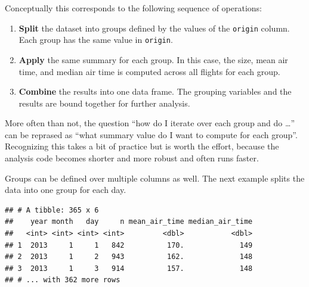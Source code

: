 \documentclass[]{book}
\newenvironment{Shaded}{}{}
\newcommand{\DataTypeTok}[1]{#1}
\newcommand{\KeywordTok}[1]{\textcolor[rgb]{0.00,0.00,1.00}{#1}}
\newcommand{\NormalTok}[1]{#1}
\newcommand{\OperatorTok}[1]{#1}
\newcommand{\OtherTok}[1]{\textcolor[rgb]{1.00,0.25,0.00}{#1}}
\newcommand{\StringTok}[1]{\textcolor[rgb]{0.00,0.50,0.50}{#1}}
\providecommand{\tightlist}{%
  \setlength{\itemsep}{0pt}\setlength{\parskip}{0pt}}
\begin{document}
Conceptually this corresponds to the following sequence of operations:

\begin{enumerate}
\def\labelenumi{\arabic{enumi}.}
\tightlist
\item
  \textbf{Split} the dataset into groups defined by the values of the \texttt{origin} column.
  Each group has the same value in \texttt{origin}.
\item
  \textbf{Apply} the same summary for each group.
  In this case, the size, mean air time, and median air time is computed
  across all flights for each group.
\item
  \textbf{Combine} the results into one data frame.
  The grouping variables and the results are bound together for further analysis.
\end{enumerate}

More often than not, the question ``how do I iterate over each group and do \ldots{}'' can be reprased as ``what summary value do I want to compute for each group''.
Recognizing this takes a bit of practice but is worth the effort, because the analysis code becomes shorter and more robust and often runs faster.

Groups can be defined over multiple columns as well.
The next example splits the data into one group for each day.

\begin{Shaded}
\end{Shaded}

\begin{verbatim}
## # A tibble: 365 x 6
##    year month   day     n mean_air_time median_air_time
##   <int> <int> <int> <int>         <dbl>           <dbl>
## 1  2013     1     1   842          170.             149
## 2  2013     1     2   943          162.             148
## 3  2013     1     3   914          157.             148
## # ... with 362 more rows
\end{verbatim}
\end{document}
